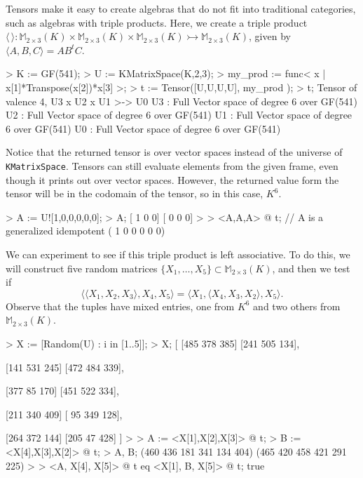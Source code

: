 \begin{example}[BBTripleProduct] Tensors make it easy to create algebras that do
not fit into traditional categories, such as algebras with triple products.
Here, we create a triple product $\langle \,\rangle : \mathbb{M}_{2\times
3}(K)\times \mathbb{M}_{2\times 3}(K)\times\mathbb{M}_{2\times
3}(K)\rightarrowtail \mathbb{M}_{2\times 3}(K)$, given by $\langle A, B,
C\rangle = AB^tC$.

\begin{code}
> K := GF(541);
> U := KMatrixSpace(K,2,3);
> my_prod := func< x | x[1]*Transpose(x[2])*x[3] >;
> t := Tensor([U,U,U,U], my_prod );
> t;
Tensor of valence 4, U3 x U2 x U1 >-> U0
U3 : Full Vector space of degree 6 over GF(541)
U2 : Full Vector space of degree 6 over GF(541)
U1 : Full Vector space of degree 6 over GF(541)
U0 : Full Vector space of degree 6 over GF(541)
\end{code}

Notice that the returned tensor is over vector spaces instead of the universe of \texttt{KMatrixSpace}.
Tensors can still evaluate elements from the given frame, even though it prints out over vector spaces. 
However, the returned value form the tensor will be in the codomain of the tensor, so in this case, $K^6$.
\begin{code}
> A := U![1,0,0,0,0,0];
> A;
[  1   0   0]
[  0   0   0]
> 
> <A,A,A> @ t;  // A is a generalized idempotent
(  1   0   0   0   0   0)
\end{code}

We can experiment to see if this triple product is left associative. To do this,
we will construct five random matrices $\{ X_1,\dots,X_5\}\subset
\mathbb{M}_{2\times 3}(K)$, and then we test if 
\[ \langle \langle X_1, X_2, X_3 \rangle, X_4, X_5\rangle = \langle X_1, \langle X_4, X_3, X_2\rangle, X_5\rangle. \]
Observe that the tuples have mixed entries, one from $K^6$ and two others from $\mathbb{M}_{2\times 3}(K)$. 

\begin{code}
> X := [Random(U) : i  in [1..5]];
> X;
[
    [485 378 385]
    [241 505 134],

    [141 531 245]
    [472 484 339],

    [377  85 170]
    [451 522 334],

    [211 340 409]
    [ 95 349 128],

    [264 372 144]
    [205  47 428]
]
> 
> A := <X[1],X[2],X[3]> @ t;
> B := <X[4],X[3],X[2]> @ t;
> A, B;
(460 436 181 341 134 404)
(465 420 458 421 291 225)
> 
> <A, X[4], X[5]> @ t eq <X[1], B, X[5]> @ t;
true
\end{code}


\end{example}
